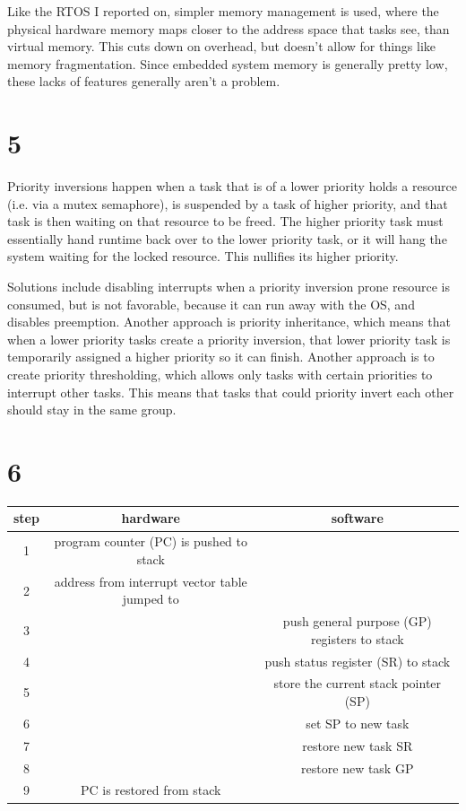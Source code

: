 \documentclass[11pt,letterpaper]{article}
\begin{document}
Like the RTOS I reported on, simpler memory management is used, where the 
physical hardware memory maps closer to the address space that tasks see, than virtual memory.
This cuts down on overhead, but doesn't allow for things like memory fragmentation. Since embedded
system memory is generally pretty low, these lacks of features generally aren't a problem.


\section*{5}
Priority inversions happen when a task that is of a lower priority holds a resource (i.e. via a mutex 
semaphore), is suspended by a task of higher priority, and that task is then waiting on that resource to
be freed. The higher priority task must essentially hand runtime back over to the lower priority task, or it
will hang the system waiting for the locked resource. This nullifies its higher priority. 

Solutions include disabling interrupts when a priority inversion prone resource is consumed, but is not 
favorable, because it can run away with the OS, and disables preemption. Another approach is priority
inheritance, which means that when a lower priority tasks create a priority inversion, that lower priority task
is temporarily assigned a higher priority so it can finish. Another approach is to create
priority thresholding, which allows only tasks with certain priorities to interrupt other tasks. This means
that tasks that could priority invert each other should stay in the same group. 


\section*{6}
\begin{tabular}{ | c | c | c | }
	\hline
	step	&	hardware								&	software \\
	\hline
	1	&	program counter (PC) is pushed to stack		& \\
	\hline
	2	&	address from interrupt vector table jumped to & \\
	\hline
	3	&										& push general purpose (GP) registers to stack \\
	\hline
	4	&										& push status register (SR) to stack \\
	\hline
	5	&										& store the current stack pointer (SP) \\
	\hline
	6	&										& set SP to new task \\
	\hline
	7	&										& restore new task SR \\
	\hline
	8	&										& restore new task GP \\
	\hline
	9	&	PC is restored from stack					& \\
	\hline
\end{tabular}
\end{document}
